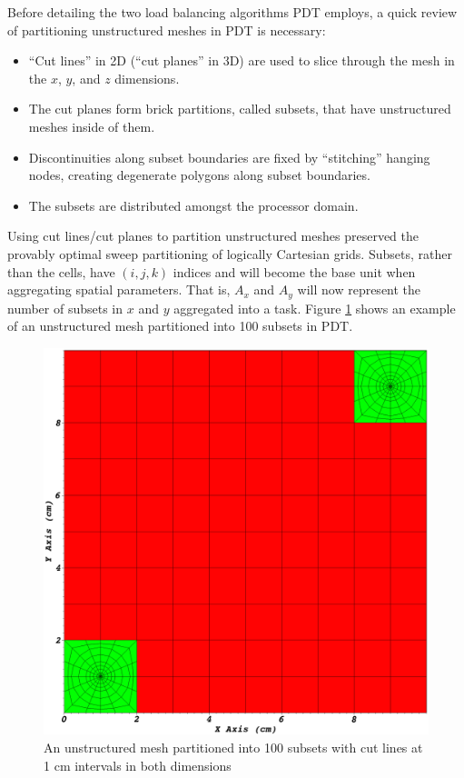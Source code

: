 Before detailing the two load balancing algorithms PDT employs, a quick review of partitioning unstructured meshes in PDT is necessary:
\begin{itemize}
\item ``Cut lines'' in 2D (``cut planes'' in 3D) are used to slice through the mesh in the $x$, $y$, and $z$ dimensions.
\item The cut planes form brick partitions, called subsets, that have unstructured meshes inside of them. 
\item Discontinuities along subset boundaries are fixed by ``stitching'' hanging nodes, creating degenerate polygons along subset boundaries.
\item The subsets are distributed amongst the processor domain.
\end{itemize}
Using cut lines/cut planes to partition unstructured meshes preserved the provably optimal sweep partitioning \cite{mpadams2013,mpadams2015} of logically Cartesian grids. 
Subsets, rather than the cells, have $(i,j,k)$ indices and will become the base unit when aggregating spatial parameters. That is, $A_x$ and $A_y$ will now represent the number of subsets in $x$ and $y$ aggregated into a task. 
Figure \ref{partitioning_example} shows an example of an unstructured mesh partitioned into 100 subsets in PDT. 
\begin{figure}[H]
\centering
\includegraphics[scale=0.2]{../figures/spiderweb_10x10_sparse.png}
\caption{An unstructured mesh partitioned into 100 subsets with cut lines at 1 cm intervals in both dimensions}
\label{partitioning_example}
\end{figure}

